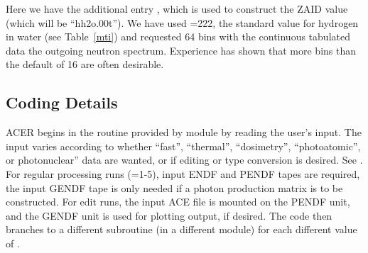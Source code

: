 \noindent
Here we have the additional entry , which is
used to construct the ZAID value (which will be ``hh2o.00t'').
We have used =222, the standard value for hydrogen
in water (see Table~\ref{mti}) and requested 64 bins with
the continuous tabulated data the outgoing neutron spectrum.
Experience has shown that more bins than the default of 16 are often
desirable.


\subsection{Coding Details}
\label{ssACER_details}

ACER begins in the  routine
provided by module 
by reading the user's input.  The input varies according to
whether ``fast'', ``thermal'', ``dosimetry'', ``photoatomic'',
or photonuclear'' data are wanted, or if editing or type conversion
is desired.  See .  For regular processing runs
(=1-5), input ENDF and PENDF tapes are required,
the input GENDF tape is only needed if a photon production
matrix is to be constructed.  For edit runs, the input
ACE file is mounted on the PENDF unit, and the GENDF unit is used
for plotting output, if desired.  The code then branches to a
different subroutine (in a different module) for each different value
of .

